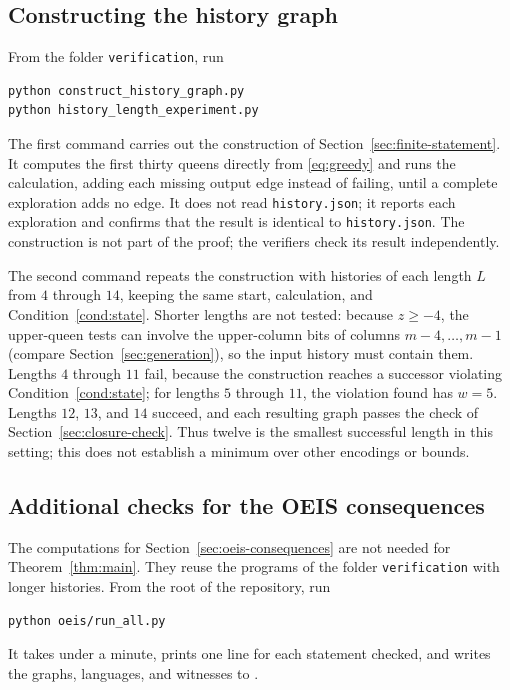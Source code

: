\subsection{Constructing the history graph}\label{app:construction}
From the folder \texttt{verification}, run
\begin{verbatim}
python construct_history_graph.py
python history_length_experiment.py
\end{verbatim}
The first command carries out the construction of
Section~\ref{sec:finite-statement}. It computes the first thirty
queens directly from \eqref{eq:greedy} and runs the calculation, adding
each missing output edge instead of failing, until a complete
exploration adds no edge. It does not read \texttt{history.json}; it
reports each exploration and confirms that the result is identical to
\texttt{history.json}. The construction is not part of the proof; the
verifiers check its result independently.

The second command repeats the construction with histories of each
length $L$ from $4$ through $14$, keeping the same start, calculation,
and Condition~\ref{cond:state}. Shorter lengths are not tested:
because $z\ge-4$, the upper-queen tests can involve the upper-column
bits of columns $m-4,\dots,m-1$ (compare Section~\ref{sec:generation}),
so the input history must contain them. Lengths $4$ through $11$ fail,
because the construction reaches a successor violating
Condition~\ref{cond:state}; for lengths $5$ through $11$, the violation
found has $w=5$. Lengths $12$, $13$, and $14$ succeed, and each
resulting graph passes the check of Section~\ref{sec:closure-check}.
Thus twelve is the smallest successful length in this setting; this
does not establish a minimum over other encodings or bounds.

\subsection{Additional checks for the OEIS consequences}\label{app:oeis-checks}

The computations for Section~\ref{sec:oeis-consequences} are not
needed for Theorem~\ref{thm:main}. They reuse the programs of the
folder \texttt{verification} with longer histories. From the root of
the repository, run
\begin{verbatim}
python oeis/run_all.py
\end{verbatim}
It takes under a minute, prints one line for each statement checked,
and writes the graphs, languages, and witnesses to
.

